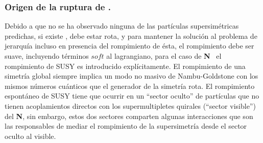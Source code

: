 \subsubsection{Origen de la ruptura de \SUSY.}
Debido a que no se ha observado ninguna de las partículas supersimétricas predichas, si existe \SUSY, debe estar rota, y para mantener la solución al problema de jerarquía incluso en presencia del rompimiento de ésta, el rompimiento debe ser suave, incluyendo términos $soft$ al lagrangiano, para el caso de \textbf{N}\MSSM ~ el rompimiento de SUSY es introducido explícitamente. El rompimiento de una simetría global siempre implica un modo no masivo de Nambu-Goldstone con los mismos números cuánticos que el generador de la simetría rota. %
El rompimiento espontáneo de SUSY tiene que ocurrir en un ``sector oculto'' de partículas que no tienen acoplamientos directos con los supermultipletes quirales (``sector visible'') del \textbf{N}\MSSM, sin embargo, estos dos sectores comparten algunas interacciones que son las responsables de mediar el rompimiento de la supersimetría desde el sector oculto al visible.









